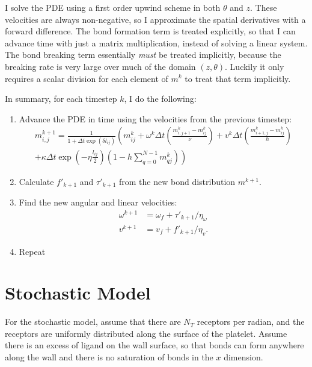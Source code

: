\documentclass{article}
\begin{document}
I solve the PDE using a first order upwind scheme in both $\theta$ and
$z$. These velocities are always non-negative, so I approximate the
spatial derivatives with a forward difference. The bond formation term
is treated explicitly, so that I can advance time with just a matrix
multiplication, instead of solving a linear system. The bond breaking
term essentially \emph{must} be treated implicitly, because the
breaking rate is very large over much of the domain $(z,
\theta)$. Luckily it only requires a scalar division for each
element of $m^k$ to treat that term implicitly.

In summary, for each timestep $k$, I do the following:
\begin{enumerate}
\item Advance the PDE in time using the velocities from the previous
  timestep:
  \begin{multline}
    \label{eq:pde-timestep}
    m_{i,j}^{k+1} = \frac{1}{1 + \Delta t \exp(\delta l_{ij})}
    \left(m_{ij}^k + \omega^k \Delta t \left(\frac{m_{i, j+1}^k -
          m_{ij}^k}{\nu}\right) + v^k \Delta t \left(\frac{m_{i+1, j}^k
          - m_{ij}^k}{h}\right)\right. \\
      \left. + \kappa \Delta t \exp\left(-\eta
        \frac{l_{ij}}{2}\right) \left(1 - h \sum_{q = 0}^{N-1}
        m_{qj}^k\right)\right) 
  \end{multline}
\item Calculate $f'_{k+1}$ and $\tau'_{k+1}$ from the new bond
  distribution $m^{k+1}$.
\item Find the new angular and linear velocities:
  \begin{align}
    \label{eq:ang-timestep}
    \omega^{k+1} &= \omega_f + \tau'_{k+1}/\eta_\omega \\
    \label{eq:vel-timestep}
    v^{k+1} &= v_f + f'_{k+1}/\eta_v.
  \end{align}
\item Repeat
\end{enumerate}

\section{Stochastic Model}
\label{sec:stochastic-model}

For the stochastic model, assume that there are $N_T$ receptors per
radian, and the receptors are uniformly distributed along the surface
of the platelet. Assume there is an excess of ligand on the wall
surface, so that bonds can form anywhere along the wall and there is
no saturation of bonds in the $x$ dimension.
\end{document}
